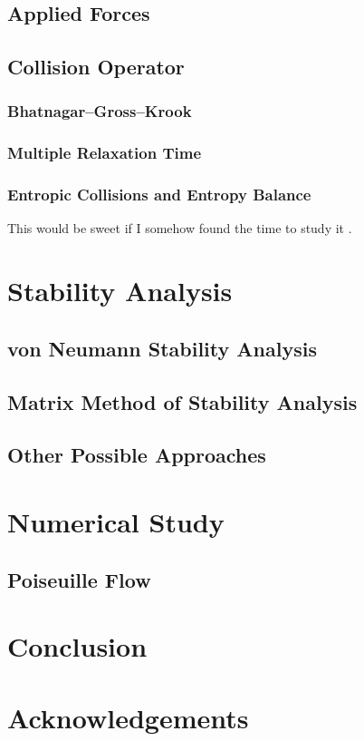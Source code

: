 \documentclass{article}
\begin{document}
\subsection{Applied Forces}

\subsection{Collision Operator}

\subsubsection{Bhatnagar--Gross--Krook}

\subsubsection{Multiple Relaxation Time}

\subsubsection{Entropic Collisions and Entropy Balance}

This would be sweet if I somehow found the time to study it \cite{gorban2014enhancement}.

\section{Stability Analysis}

\subsection{von Neumann Stability Analysis}

\subsection{Matrix Method of Stability Analysis}

\subsection{Other Possible Approaches}

\section{Numerical Study}

\subsection{Poiseuille Flow}

\section{Conclusion}

\section*{Acknowledgements}



	
\end{document}
